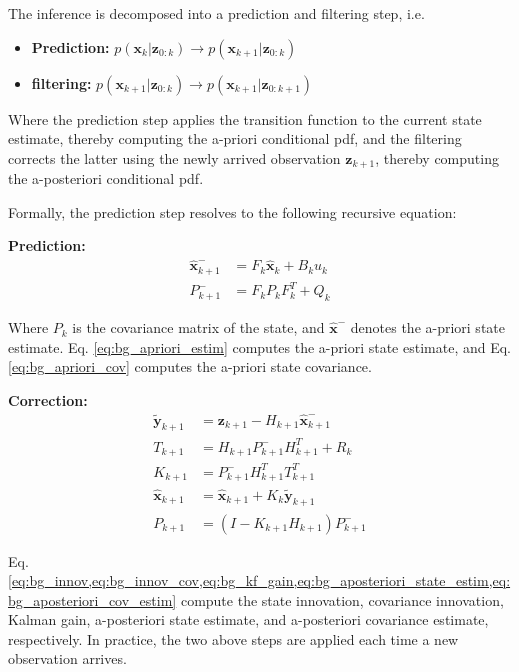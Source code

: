 The inference is decomposed into a prediction and filtering step, i.e.

\begin{itemize}
    \item \textbf{Prediction: } $p(\bm{x}_{k}|\bm{z}_{0:k}) \rightarrow p(\bm{x}_{k+1}|\bm{z}_{0:k})$
    \item \textbf{filtering: } $p(\bm{x}_{k+1}|\bm{z}_{0:k}) \rightarrow p(\bm{x}_{k+1}|\bm{z}_{0:k+1})$
\end{itemize}

Where the prediction step applies the transition function to the current state estimate, thereby computing the a-priori conditional \gls{pdf}, and the filtering corrects the latter using the newly arrived observation $\bm{z}_{k+1}$, thereby computing the a-posteriori conditional \gls{pdf}.

Formally, the prediction step resolves to the following recursive equation:

\textbf{Prediction:}
\begin{align}
  \bm{\hat x}^{-}_{k+1}&=F_{k} \bm{\hat x}_{k} + B_{k}u_{k} \label{eq:bg_apriori_estim}\\
  P_{k+1}^{-}&=F_{k} P_{k} F_{k}^{T} + Q_{k} \label{eq:bg_apriori_cov}
\end{align}

Where $P_{k}$ is the covariance matrix of the state, and $\bm{\hat x}^{-}$ denotes the a-priori state estimate.
Eq. \ref{eq:bg_apriori_estim} computes the a-priori state estimate, and Eq. \ref{eq:bg_apriori_cov} computes the a-priori state covariance.

\textbf{Correction:}
\begin{align}
  \bm{\tilde y}_{k+1} &= \bm{z}_{k+1} - H_{k+1} \bm{\hat x}_{k+1}^{-} \label{eq:bg_innov} \\
  T_{k+1} &= H_{k+1} P_{k+1}^{-} H_{k+1}^{T} + R_{k} \label{eq:bg_innov_cov} \\
  K_{k+1} &= P_{k+1}^{-} H_{k+1}^{T} T_{k+1}^{T} \label{eq:bg_kf_gain}\\
  \bm{\hat x}_{k+1} &= \bm{\hat x}_{k+1} + K_{k} \bm{\tilde y}_{k+1} \label{eq:bg_aposteriori_state_estim}\\
  P_{k+1} &= (I - K_{k+1}H_{k+1}) P_{k+1}^{-} \label{eq:bg_aposteriori_cov_estim}
\end{align}

Eq. \cref{eq:bg_innov,eq:bg_innov_cov,eq:bg_kf_gain,eq:bg_aposteriori_state_estim,eq:bg_aposteriori_cov_estim} compute the state innovation, covariance innovation, Kalman gain, a-posteriori state estimate, and a-posteriori covariance estimate, respectively.
In practice, the two above steps are applied each time a new observation arrives.

